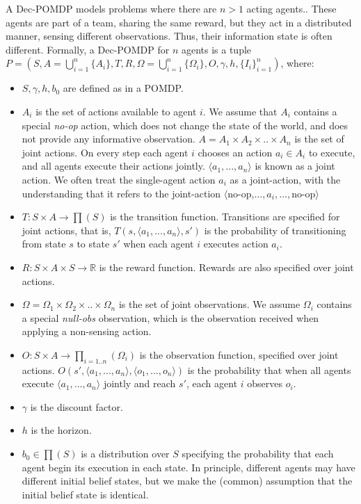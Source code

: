 \documentclass[letterpaper]{article} %
\theoremstyle{definition}
\begin{document}
A Dec-POMDP models problems where there are $n>1$ acting agents.. 
These agents are part of a team, sharing the same reward, but they act in a distributed manner,
sensing different observations. Thus, their information state is often different. 
Formally, a Dec-POMDP for $n$ agents is a tuple  $P=(S, A=\bigcup_{i=1}^{n}{\{A_i\}}, T, R, \Omega=\bigcup_{i=1}^{n}{\{\Omega_i\}},  O, \gamma, h, {\{I_i\}}_{i=1}^{n})$, where:
\begin{itemize}
\item
$S,\gamma,h,b_0$ are defined as in a POMDP.
\item
$A_i$ is the set of actions available to agent $i$. We assume that $A_i$ contains a special {\em no-op} action, which does not change the state of the world, and does not provide any informative observation. 
$A=A_1 \times A_2 \times .. \times A_n$ is the set of joint actions. On every step each agent $i$ chooses an action $a_i \in A_i$ to execute, and all agents execute their actions jointly. $\langle a_1,...,a_n \rangle$ is known as a joint action. We often treat the
single-agent action $a_i$ as a joint-action, with the understanding that it refers to the joint-action $\langle$no-op,$\ldots,a_i,\ldots,$no-op$\rangle$
\item
$T:S \times A \rightarrow \prod(S)$  is the transition function. Transitions are specified for joint actions, that is, $T(s, \langle a_1,...,a_n \rangle, s')$ is the probability of transitioning from state $s$ to state $s'$ when each agent $i$ executes action $a_i$.
\item
$R:S \times A \times S \rightarrow \mathbb{R}$  is the reward function. Rewards are also specified over joint actions.
\item
$\Omega = \Omega_1 \times \Omega_2 \times .. \times \Omega_n$ is the set of joint observations. We assume $\Omega_i$ contains a special {\em null-obs} observation, which is the observation received when applying a non-sensing action.
\item
$O:S \times A \rightarrow \prod_{i=1..n}(\Omega_i)$  is the observation function, specified over joint actions. $O(s',\langle a_1,...,a_n \rangle,\langle o_1,...,o_n \rangle)$ is the probability that when all agents execute $\langle a_1,...,a_n \rangle$ jointly and reach $s'$, each agent $i$ observes $o_i$.
\item
$\gamma$  is the discount factor.
\item
$h$ is the horizon.
\item
$b_0 \in \prod(S)$ is a distribution over $S$ specifying the probability that each agent begin its execution in each state. In principle, different agents may have different initial belief states, but
we make the (common) assumption that the initial belief state is identical. 
\end{itemize}
\end{document}
